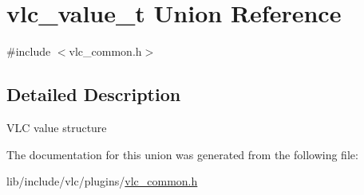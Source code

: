 \hypertarget{unionvlc__value__t}{}\section{vlc\+\_\+value\+\_\+t Union Reference}
\label{unionvlc__value__t}


{\ttfamily \#include $<$vlc\+\_\+common.\+h$>$}



\subsection{Detailed Description}
V\+LC value structure 

The documentation for this union was generated from the following file\+:\begin{DoxyCompactItemize}
\item 
lib/include/vlc/plugins/\hyperlink{vlc__common_8h}{vlc\+\_\+common.\+h}\end{DoxyCompactItemize}
